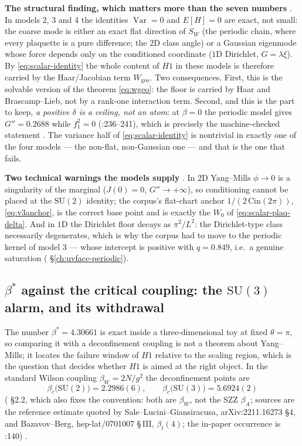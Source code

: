 \normalsize
\textbf{The structural finding, which matters more than the seven numbers} \LT. In models 2, 3 and 4
the identities $\operatorname{Var}=0$ and $E[H]=0$ are exact, not small: the coarse mode is either
an exact flat direction of $S_W$ (the periodic chain, where every plaquette is a pure difference;
the $2$D class angle) or a Gaussian eigenmode whose force depends only on the conditioned
coordinate ($1$D Dirichlet, $G=\lambda\xi$). By \eqref{eq:scalar-identity} the whole content of
$H1$ in these models is therefore carried by the Haar/Jacobian term $W_{\mathrm{geo}}$. Two
consequences. First, this is the solvable version of the theorem \eqref{eq:wgeo}: the floor is
carried by Haar and Brascamp--Lieb, not by a rank-one interaction term. Second, and this is the
part to keep, \emph{a positive $\delta$ is a ceiling, not an atom}: at $\beta=0$ the periodic model
gives $G''=0.2688$ while $f_1^2=0$ (:236--241), which is precisely the
machine-checked statement . The variance half of \eqref{eq:scalar-identity}
is nontrivial in exactly one of the four models --- the non-flat, non-Gaussian one --- and that is
the one that fails.

\textbf{Two technical warnings the models supply} \LT. In $2$D Yang--Mills $\phi\to0$ is a
singularity of the marginal ($J(0)=0$, $G''\to+\infty$), so conditioning cannot be placed at the
$\mathrm{SU}(2)$ identity; the corpus's flat-chart anchor $1/(2\,\mathrm{Cin}(2\pi))$,
\eqref{eq:v3anchor}, is the correct base point and is exactly the $W_0$ of
\eqref{eq:scalar-plaq-delta}. And in $1$D the Dirichlet floor decays as $\pi^2/L^2$: the
Dirichlet-type class necessarily degenerates, which is why the corpus had to move to the periodic
kernel of model 3 --- whose intercept is positive with $q=0.849$, i.e.\ a genuine saturation
( \S\ref{ch:uvface-periodic}).

\subsection{$\beta^*$ against the critical coupling: the $\mathrm{SU}(3)$ alarm, and its
withdrawal}
\label{sec:scalar-beta-star}

The number $\beta^*=4.30661$ is exact inside a three-dimensional toy at fixed $\theta=\pi$, so
comparing it with a deconfinement coupling is not a theorem about Yang--Mills; it locates the
failure window of $H1$ relative to the scaling region, which is the question that decides whether
$H1$ is aimed at the right object. In the standard Wilson coupling $\beta_W=2N/g^2$ the
deconfinement points are
\begin{equation}
\beta_c\bigl(\mathrm{SU}(2)\bigr)=2.2986(6),\qquad
\beta_c\bigl(\mathrm{SU}(3)\bigr)=5.6924(2)
\label{eq:scalar-betac}
\end{equation}
( \S2.2, which also fixes the convention: both are
$\beta_W$, not the SZZ $\beta_A$; sources are the reference estimate quoted by
Sale--Lucini--Giansiracusa, arXiv:2211.16273 \S4, and Bazavov--Berg, hep-lat/0701007 \S\,III,
$\beta_t(4)$; the in-paper occurrence is :140) \LC.

